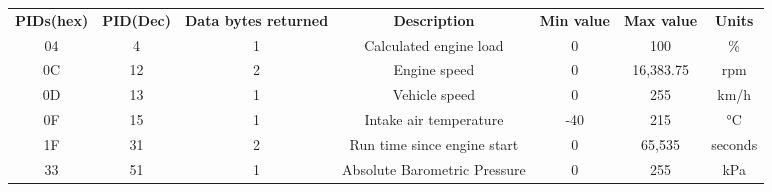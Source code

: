 \begin{table}[]
\begin{tabular}{ccccccc}
\rowcolor[HTML]{C0C0C0} 
{\color[HTML]{FFFFFF} \textbf{PIDs(hex)}} & {\color[HTML]{FFFFFF} \textbf{PID(Dec)}} & {\color[HTML]{FFFFFF} \textbf{Data bytes returned}} & {\color[HTML]{FFFFFF} \textbf{Description}} & {\color[HTML]{FFFFFF} \textbf{Min value}} & {\color[HTML]{FFFFFF} \textbf{Max value}} & {\color[HTML]{FFFFFF} \textbf{Units}} \\
04                                         & 4                                        & 1                                                   & Calculated engine load                      & 0                                         & 100                                       & \%                                    \\
0C                                        & 12                                       & 2                                                   & Engine speed                                & 0                                         & 16,383.75                                 & rpm                                   \\
0D                                        & 13                                       & 1                                                   & Vehicle speed                               & 0                                         & 255                                       & km/h                                  \\
0F                                        & 15                                       & 1                                                   & Intake air temperature                      & -40                                       & 215                                       & °C                                    \\
1F                                        & 31                                       & 2                                                   & Run time since engine start                 & 0                                         & 65,535                                    & seconds                               \\
33                                        & 51                                       & 1                                                   & Absolute Barometric Pressure                & 0                                         & 255                                       & kPa                                   \\

\end{tabular}
\end{table}
